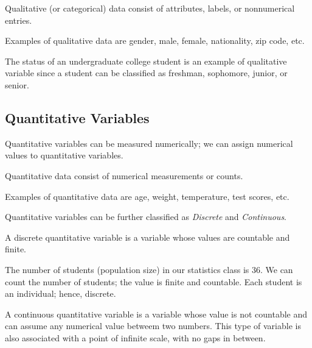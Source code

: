 \begin{definition} 
Qualitative (or categorical) data consist of attributes, labels, or nonnumerical entries.
\end{definition} 

\begin{example} 
Examples of qualitative data are gender, male, female, nationality, zip code, etc.
\end{example}  

\begin{example} 
   The status of an undergraduate college student is an example of qualitative variable since a student can be classified as freshman, sophomore, junior, or senior.
   \end{example} 

\subsection{Quantitative Variables}

Quantitative variables can be measured numerically; we can assign numerical values to quantitative variables. 

\begin{definition} 
   Quantitative data consist of numerical measurements or counts.
   \end{definition} 
   
   \begin{example} 
   Examples of quantitative data are age, weight, temperature, test scores, etc.
   \end{example} 

Quantitative variables can be further classified as {\it{Discrete}} and {\it{Continuous}}.

\begin{definition} 
A discrete quantitative variable is a variable whose values are countable and finite. 
\end{definition} 

\begin{example}
The number of students (population size) in our statistics class is 36. We can count the number of students; the value is finite and countable. Each student is an individual; hence, discrete. 
\end{example} 

\begin{definition} 
A continuous quantitative variable is a variable whose value is not countable and can assume any numerical value betweem two numbers. This type of variable is also associated with a point of infinite scale, with no gaps in between. 
\end{definition} 

